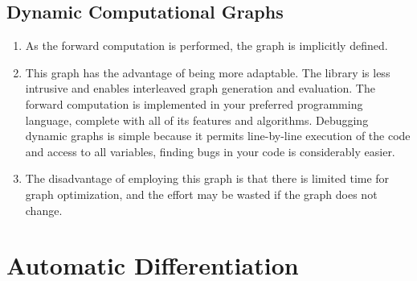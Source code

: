\subsection{Dynamic Computational Graphs}

\begin{enumerate}
    \item As the forward computation is performed, the graph is implicitly defined.
    
    \item This graph has the advantage of being more adaptable. 
    The library is less intrusive and enables interleaved graph generation and evaluation. 
    The forward computation is implemented in your preferred programming language, complete with all of its features and algorithms. 
    Debugging dynamic graphs is simple because it permits line-by-line execution of the code and access to all variables, finding bugs in your code is considerably easier. 
    
    \item The disadvantage of employing this graph is that there is limited time for graph optimization, and the effort may be wasted if the graph does not change.
\end{enumerate}






\section{Automatic Differentiation}

